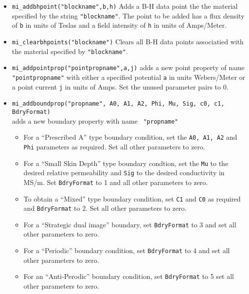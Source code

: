 \begin{itemize}
\item{\tt mi\_addbhpoint("blockname",b,h)} Adds a B-H data point the
the material specified by the string {\tt "blockname"}.  The point to be added
has a flux density of {\tt b} in units of Teslas and a field
intensity of {\tt h} in units of Amps/Meter.

\item{\tt mi\_clearbhpoints("blockname")} Clears all B-H data points
associatied with the material specified by {\tt "blockname"}.

\item{\tt mi\_addpointprop("pointpropname",a,j)}
adds a new point property of name {\tt "pointpropname"} with either
a specified potential {\tt a} in units Webers/Meter
or a point current {\tt j} in units of Amps. Set the
unused parameter pairs to 0.

\item{\tt mi\_addboundprop("propname", A0, A1, A2, Phi, Mu, Sig, c0, c1,
BdryFormat)} \\ adds a new boundary property with name {\tt
"propname"}
        \begin{itemize}
        \item For a ``Prescribed A'' type boundary condition, set the {\tt A0,
        A1, A2} and {\tt Phi} parameters as required. Set all other
        parameters to zero.

        \item For a ``Small Skin Depth'' type boundary condtion, set the {\tt Mu}
        to the desired relative permeability and {\tt Sig} to the desired
        conductivity in MS/m.  Set {\tt BdryFormat} to 1 and all other
        parameters to zero.

        \item To obtain a ``Mixed'' type boundary condition, set {\tt C1} and
        {\tt C0} as required and {\tt BdryFormat} to 2.  Set all other
        parameters to zero.

        \item For a ``Strategic dual image'' boundary, set {\tt BdryFormat} to 3
        and set all other parameters to zero.

        \item For a ``Periodic'' boundary condition, set {\tt BdryFormat} to 4 and
        set all other parameters to zero.

        \item For an ``Anti-Perodic'' boundary condition, set {\tt BdryFormat} to
        5 set all other parameters to zero.
        \end{itemize}


\end{itemize}
